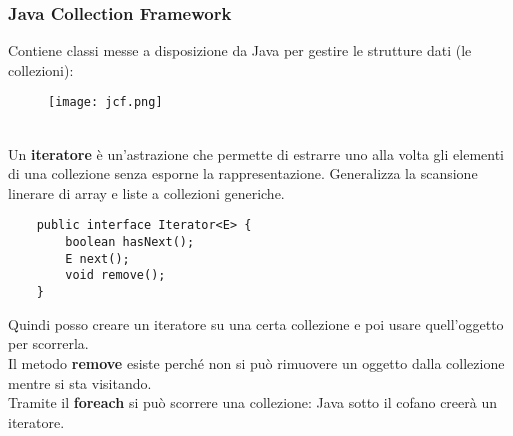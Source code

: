 \subsubsection{Java Collection Framework}
Contiene classi messe a disposizione da Java per gestire le strutture dati (le collezioni):
\begin{figure}
	\texttt{[image: jcf.png]}
\end{figure}\\
Un \textbf{iteratore} è un'astrazione che permette di estrarre uno alla volta gli elementi di una collezione senza esporne la rappresentazione. Generalizza la scansione linerare di array e liste a collezioni generiche.
\begin{lstlisting}
	public interface Iterator<E> {
		boolean hasNext();
		E next();
		void remove();
	}
\end{lstlisting}
Quindi posso creare un iteratore su una certa collezione e poi usare quell'oggetto per scorrerla.\\
Il metodo \textbf{remove} esiste perché non si può rimuovere un oggetto dalla collezione mentre si sta visitando.\\
Tramite il \textbf{foreach} si può scorrere una collezione: Java sotto il cofano creerà un iteratore.